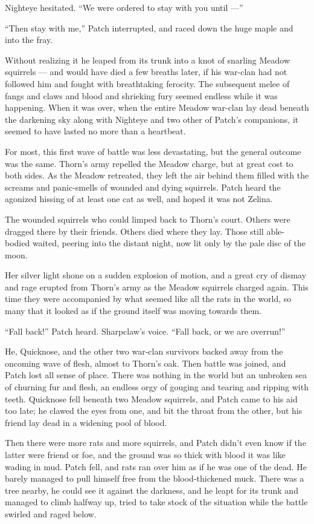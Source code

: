 \documentclass[ebook,oneside,openany,17pt]{memoir}
\begin{document}
Nighteye hesitated. “We were ordered to stay with you until —”

“Then stay with me,” Patch interrupted, and raced down the huge maple
and into the fray.

Without realizing it he leaped from its trunk into a knot of snarling
Meadow squirrels — and would have died a few breaths later, if his
war-clan had not followed him and fought with breathtaking
ferocity. The subsequent melee of fangs and claws and blood and
shrieking fury seemed endless while it was happening. When it was
over, when the entire Meadow war-clan lay dead beneath the darkening
sky along with Nighteye and two other of Patch’s companions, it seemed
to have lasted no more than a heartbeat.

For most, this first wave of battle was less devastating, but the
general outcome was the same. Thorn’s army repelled the Meadow charge,
but at great cost to both sides. As the Meadow retreated, they left
the air behind them filled with the screams and panic-smells of
wounded and dying squirrels. Patch heard the agonized hissing of at
least one cat as well, and hoped it was not Zelina.

The wounded squirrels who could limped back to Thorn’s court. Others
were dragged there by their friends. Others died where they lay. Those
still able-bodied waited, peering into the distant night, now lit only
by the pale disc of the moon.

Her silver light shone on a sudden explosion of motion, and a great
cry of dismay and rage erupted from Thorn’s army as the Meadow
squirrels charged again. This time they were accompanied by what
seemed like all the rats in the world, so many that it looked as if
the ground itself was moving towards them.

“Fall back!” Patch heard. Sharpclaw’s voice. “Fall back, or we are
overrun!”

He, Quicknose, and the other two war-clan survivors backed away from
the oncoming wave of flesh, almost to Thorn’s oak. Then battle was
joined, and Patch lost all sense of place. There was nothing in the
world but an unbroken sea of churning fur and flesh, an endless orgy
of gouging and tearing and ripping with teeth. Quicknose fell beneath
two Meadow squirrels, and Patch came to his aid too late; he clawed
the eyes from one, and bit the throat from the other, but his friend
lay dead in a widening pool of blood.

Then there were more rats and more squirrels, and Patch didn’t even
know if the latter were friend or foe, and the ground was so thick
with blood it was like wading in mud. Patch fell, and rats ran over
him as if he was one of the dead. He barely managed to pull himself
free from the blood-thickened muck. There was a tree nearby, he could
see it against the darkness, and he leapt for its trunk and managed to
climb halfway up, tried to take stock of the situation while the
battle swirled and raged below.
\end{document}
